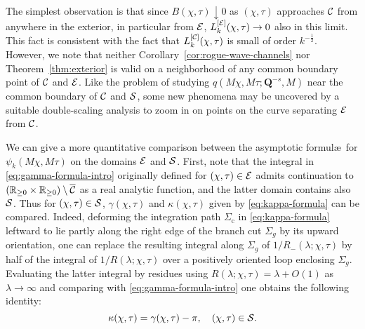 The simplest observation is that since $B(\chi,\tau)\downarrow 0$ as $(\chi,\tau)$ approaches $\mathcal{C}$ from anywhere in the exterior,  in particular from $\mathcal{E}$, $L^{[\mathcal{E}]}_k(\chi,\tau)\to 0$ also in this limit.  This fact is consistent with the fact that $L^{[\mathcal{C}]}_k(\chi,\tau)$ is small of order $k^{-\frac{1}{2}}$.  However, we note that neither Corollary~\ref{cor:rogue-wave-channels} nor Theorem~\ref{thm:exterior} is valid on a neighborhood of any common boundary point of $\mathcal{C}$ and $\mathcal{E}$.  Like the problem of studying $q(M\chi,M\tau;\mathbf{Q}^{-s},M)$ near the common boundary of $\mathcal{C}$ and $\mathcal{S}$, some new phenomena may be uncovered by a suitable double-scaling analysis to zoom in on points on the curve separating $\mathcal{E}$ from $\mathcal{C}$.  

We can give a more quantitative comparison between the asymptotic formul\ae\ for $\psi_k(M\chi,M\tau)$ on the domains $\mathcal{E}$ and $\mathcal{S}$.  First, note that the integral in \eqref{eq:gamma-formula-intro} originally defined for $(\chi,\tau)\in\mathcal{E}$ admits continuation to $(\mathbb{R}_{\ge 0}\times\mathbb{R}_{\ge 0})\setminus\overline{\mathcal{C}}$ as a real analytic function, and the latter domain contains also $\mathcal{S}$.  Thus for $(\chi,\tau)\in\mathcal{S}$, $\gamma(\chi,\tau)$ and $\kappa(\chi,\tau)$ given by \eqref{eq:kappa-formula} can be compared.  Indeed, deforming the integration path $\Sigma_\mathrm{c}$ in \eqref{eq:kappa-formula} leftward to lie partly along the right edge of the branch cut $\Sigma_g$ by its upward orientation, one can replace the resulting integral along $\Sigma_g$ of $1/R_-(\lambda;\chi,\tau)$ by half of the integral of $1/R(\lambda;\chi,\tau)$ over a positively oriented loop enclosing $\Sigma_g$.  Evaluating the latter integral by residues using $R(\lambda;\chi,\tau)=\lambda + O(1)$ as $\lambda\to\infty$ and comparing with \eqref{eq:gamma-formula-intro} one obtains the following identity:
\begin{equation}
\kappa(\chi,\tau)=\gamma(\chi,\tau)-\pi,
\quad (\chi,\tau)\in\mathcal{S}.
\label{eq:kappa-gamma}
\end{equation}
